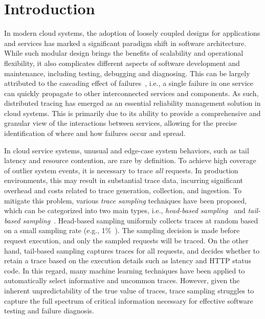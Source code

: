 \section{Introduction}

In modern cloud systems, the adoption of loosely coupled designs for applications and services has marked a significant paradigm shift in software architecture.
While such modular design brings the benefits of scalability and operational flexibility, it also complicates different aspects of software development and maintenance, including testing, debugging and diagnosing.
This can be largely attributed to the cascading effect of failures~\cite{DBLP:conf/icse/DangLH19,DBLP:conf/sigsoft/ChenKLZZXZYSXDG20}, i.e., a single failure in one service can quickly propagate to other interconnected services and components.
As such, distributed tracing has emerged as an essential reliability management solution in cloud systems.
This is primarily due to its ability to provide a comprehensive and granular view of the interactions between services, allowing for the precise identification of where and how failures occur and spread.

In cloud service systems, unusual and edge-case system behaviors, such as tail latency and resource contention, are rare by definition.
To achieve high coverage of outlier system events, it is necessary to trace \textit{all} requests.
In production environments, this may result in substantial trace data, incurring significant overhead and costs related to trace generation, collection, and ingestion.
To mitigate this problem, various \textit{trace sampling} techniques have been proposed, which can be categorized into two main types, i.e., \textit{head-based sampling}~\cite{DBLP:conf/nsdi/ZhangXAVM23} and \textit{tail-based sampling}~\cite{DBLP:conf/IEEEcloud/ChenJSLZ24,DBLP:conf/icws/HuangCYCZ21,DBLP:conf/sigsoft/HeFLZ0LR023,DBLP:conf/nsdi/ZhangXAVM23}.
Head-based sampling uniformly collects traces at random based on a small sampling rate (e.g., 1\%~\cite{DBLP:conf/nsdi/ZhangXAVM23,DBLP:conf/cloud/Las-CasasPAM19,DBLP:conf/sosp/KaldorMBGKOOSSV17}).
The sampling decision is made before request execution, and only the sampled requests will be traced.
On the other hand, tail-based sampling captures traces for all requests, and decides whether to retain a trace based on the execution details such as latency and HTTP status code.
In this regard, many machine learning techniques have been applied to automatically select informative and uncommon traces.
However, given the inherent unpredictability of the true value of traces, trace sampling struggles to capture the full spectrum of critical information necessary for effective software testing and failure diagnosis.

